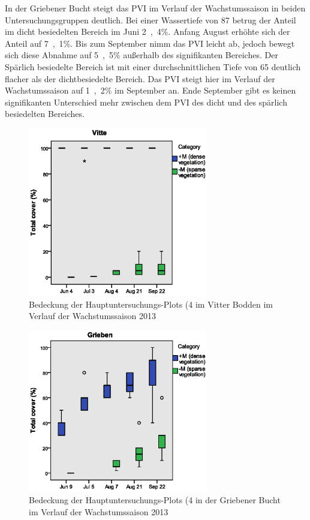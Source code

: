In der Griebener Bucht steigt das PVI im Verlauf der Wachstumssaison in beiden Untersuchungsgruppen deutlich. Bei einer Wassertiefe von \unit{87}{\centi\metre} betrug der Anteil im dicht besiedelten Bereich im Juni \unit{2,4}{\%}. Anfang August erhöhte sich der Anteil auf \unit{7,1}{\%}. Bis zum September nimm das PVI leicht ab, jedoch bewegt sich diese Abnahme auf \unit{5,5}{\%} außerhalb des signifikanten Bereiches.
Der Spärlich besiedelte Bereich ist mit einer durchschnittlichen Tiefe von \unit{65}{\centi\metre} deutlich flacher als der dichtbesiedelte Bereich. Das PVI steigt hier im Verlauf der Wachstumssaison auf \unit{1,2}{\%} im September an. Ende September gibt es keinen signifikanten Unterschied mehr zwischen dem PVI des dicht und des spärlich besiedelten Bereiches.


\begin{figure}[!htb]
\centering
\includegraphics[width=0.70\textwidth]{images/total_cover/Boxplots_G_V1.eps}
\caption[Bedeckung mit Makrophyten, Vitte]{Bedeckung der Hauptuntersuchungs-Plots (\unit{4}{\metre\squared} im Vitter Bodden im Verlauf der Wachstumssaison 2013}
\label{fig:cover_vitte}
\end{figure}

\begin{figure}[!htb]
\centering
\includegraphics[width=0.70\textwidth]{images/total_cover/Boxplots_G_V2.eps}
\caption[Bedeckung mit Makrophyten, Grieben]{Bedeckung der Hauptuntersuchungs-Plots (\unit{4}{\metre\squared} in der Griebener Bucht im Verlauf der Wachstumssaison 2013}
\label{fig:cover_grieben}
\end{figure}



